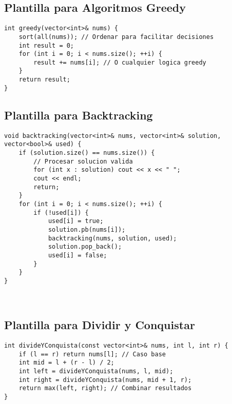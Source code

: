 \subsection{Plantilla para Algoritmos Greedy}

\begin{lstlisting}[style=cpp]
int greedy(vector<int>& nums) {
    sort(all(nums)); // Ordenar para facilitar decisiones
    int result = 0;
    for (int i = 0; i < nums.size(); ++i) {
        result += nums[i]; // O cualquier logica greedy
    }
    return result;
}
\end{lstlisting}

\subsection{Plantilla para Backtracking}

\begin{lstlisting}[style=cpp]
void backtracking(vector<int>& nums, vector<int>& solution, vector<bool>& used) {
    if (solution.size() == nums.size()) {
        // Procesar solucion valida
        for (int x : solution) cout << x << " ";
        cout << endl;
        return;
    }
    for (int i = 0; i < nums.size(); ++i) {
        if (!used[i]) {
            used[i] = true;
            solution.pb(nums[i]);
            backtracking(nums, solution, used);
            solution.pop_back();
            used[i] = false;
        }
    }
}



\end{lstlisting}

\subsection{Plantilla para Dividir y Conquistar}

\begin{lstlisting}[style=cpp]
int divideYConquista(const vector<int>& nums, int l, int r) {
    if (l == r) return nums[l]; // Caso base
    int mid = l + (r - l) / 2;
    int left = divideYConquista(nums, l, mid);
    int right = divideYConquista(nums, mid + 1, r);
    return max(left, right); // Combinar resultados
}
\end{lstlisting}
